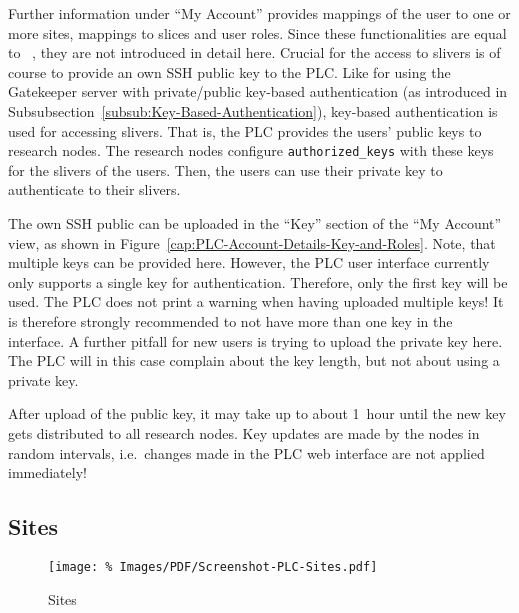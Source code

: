 Further information under ``My Account'' provides mappings of the user to one or more  sites, mappings to slices and user roles. Since these functionalities are equal to ~\cite{PR06}, they are not introduced in detail here. Crucial for the access to  slivers is of course to provide an own SSH public key to the PLC. Like for using the Gatekeeper server with private/public key-based authentication (as introduced in Subsubsection~\ref{subsub:Key-Based-Authentication}), key-based authentication is used for accessing slivers. That is, the PLC provides the users' public keys to research nodes. The research nodes configure \texttt{authorized\_keys} with these keys for the slivers of the users. Then, the users can use their private key to authenticate to their slivers.

The own SSH public can be uploaded in the ``Key'' section of the ``My Account'' view, as shown in Figure~\ref{cap:PLC-Account-Details-Key-and-Roles}. Note, that multiple keys can be provided here. However, the PLC user interface currently only supports a single key for authentication. Therefore, only the first key will be used. The PLC does not print a warning when having uploaded multiple keys! It is therefore strongly recommended to not have more than one key in the interface. A further pitfall for new users is trying to upload the private key here. The PLC will in this case complain about the key length, but not about using a private key.

After upload of the public key, it may take up to about 1~hour until the new key gets distributed to all  research nodes. Key updates are made by the nodes in random intervals, i.e.\ changes made in the PLC web interface are not applied immediately!


\subsection{Sites}
\label{sub:Sites}

\begin{figure*}
\begin{center}
\texttt{[image: \%
   Images/PDF/Screenshot-PLC-Sites.pdf]}
\end{center}
\caption{Sites}
\label{cap:PLC-Sites}
\end{figure*}

